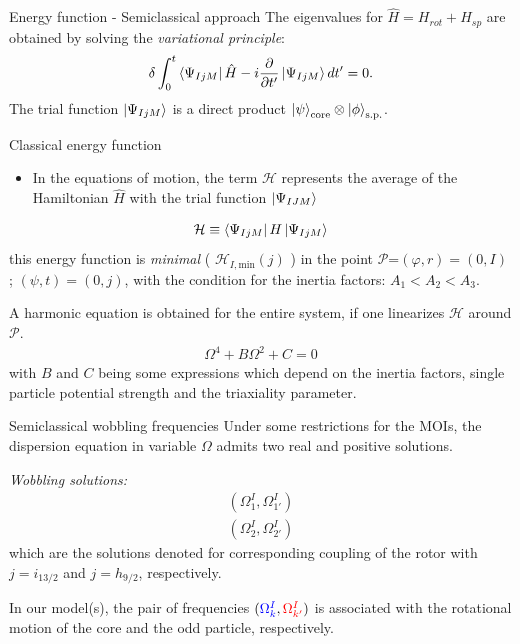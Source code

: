 \documentclass{beamer}
\begin{document}
\begin{frame}{Energy function - Semiclassical approach}
      The eigenvalues for $\hat{H}=H_{rot}+H_{sp}$ are obtained by solving the \emph{variational principle}:
  \begin{align}
    \delta \int_0^t\bra{\Psi_{IjM}}\hat{H}-i\frac{\partial}{\partial t'}\ket{\Psi_{IjM}}dt'=0.
  \end{align}
  The trial function $\ket{\Psi_{IjM}}$ is a direct product $\ket{\psi}_\text{core}\otimes\ket{\phi}_\text{s.p.}$.
\end{frame}


\begin{frame}{Classical energy function}
  \begin{itemize}
    \item In the equations of motion, the term $\mathcal{H}$ represents the average of the Hamiltonian $\hat{H}$ with the trial function $\ket{\Psi_{IJM}}$
  \end{itemize}
  \begin{align}
    \mathcal{H}\equiv\bra{\Psi_{IjM}}H\ket{\Psi_{IjM}}
  \end{align}
  this energy function is \emph{minimal} ( $\mathcal{H}_{I,\text{min}}(j)$ ) in the point $\mathcal{P}$=$(\varphi,r)=(0,I)$ ; $(\psi,t)=(0,j)$, with the condition for the inertia factors: $A_1<A_2<A_3$.
  \par A harmonic equation is obtained for the entire system, if one linearizes $\mathcal{H}$ around $\mathcal{P}$.
  \begin{align}
    \Omega^4+B\Omega^2+C=0
  \end{align}
  with $B$ and $C$ being some expressions which depend on the inertia factors, single particle potential strength and the triaxiality parameter.
\end{frame}

\begin{frame}{Semiclassical wobbling frequencies}
  Under some restrictions for the MOIs, the dispersion equation in variable $\Omega$ admits two real and positive solutions.\\
  \par \emph{Wobbling solutions:}
  \begin{align}
    (\Omega_1^I,\Omega_{1'}^I)\\
    (\Omega_2^I,\Omega_{2'}^I)
  \end{align}
  which are the solutions denoted for corresponding coupling of the rotor with $j=i_{13/2}$ and $j=h_{9/2}$, respectively.
  \par In our model(s), the pair of frequencies $({\color{blue}\Omega_k^I},{\color{red}\Omega_{k'}^I})$ is associated with the rotational motion of the {\color{blue}core} and the {\color{red}odd particle}, respectively.
\end{frame}
\end{document}
